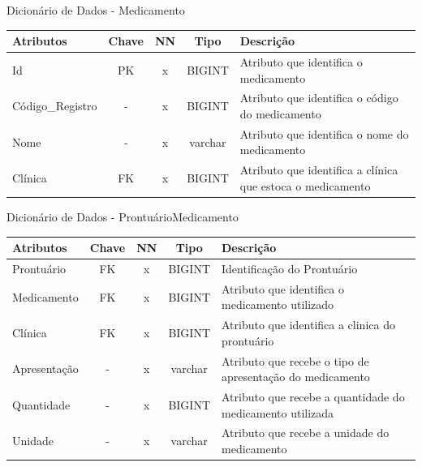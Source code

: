 \documentclass[
    12pt,               %
    openright,          %
    oneside,
    a4paper,            %
    BIBLATEX,           %
    TODO,               %
    english,            %
    brazil              %
    ]{ifsp-spo-inf-ctds}
\begin{document}
    \begin{center}
      \begin{quadro}[H]
      \centering
          \caption{Dicionário de Dados - Medicamento}
          \begin{tabulary}{1.0\textwidth}{|p{9em}|c|c|c|p{19em}|}
        \hline
        Atributos & Chave & NN & Tipo & Descrição\\
        \hline
        Id & PK & x & BIGINT & Atributo que identifica o medicamento\\
        \hline
        Código\_Registro & - & x & BIGINT & Atributo que identifica o código do medicamento\\
        \hline
        Nome & - & x & varchar & Atributo que identifica o nome do medicamento\\
        \hline
        Clínica & FK & x & BIGINT & Atributo que identifica a clínica que estoca o medicamento\\
        \hline
        \end{tabulary}
         
          \label{qd: md-medicamento}
      \end{quadro}
    \end{center}
    
    \begin{center}
      \begin{quadro}[H]
      \centering
          \caption{Dicionário de Dados - ProntuárioMedicamento}
          \begin{tabulary}{1.0\textwidth}{|p{9em}|c|c|c|p{19em}|}
        \hline
        Atributos & Chave & NN & Tipo & Descrição\\
        \hline
        Prontuário & FK & x & BIGINT & Identificação do Prontuário \\
        \hline
        Medicamento & FK & x & BIGINT & Atributo que identifica o medicamento utilizado \\
        \hline
        Clínica & FK & x & BIGINT & Atributo que identifica a clinica do prontuário\\
        \hline
        Apresentação & - & x & varchar & Atributo que recebe o tipo de apresentação do medicamento\\
        \hline
        Quantidade & - & x & BIGINT & Atributo que recebe a quantidade do medicamento utilizada\\
        \hline
        Unidade & - & x & varchar & Atributo que recebe a unidade do medicamento \\
        \hline
        \end{tabulary}
         
          \label{qd: md-prontuariomedicamento}
      \end{quadro}
    \end{center}
    
\end{document}
